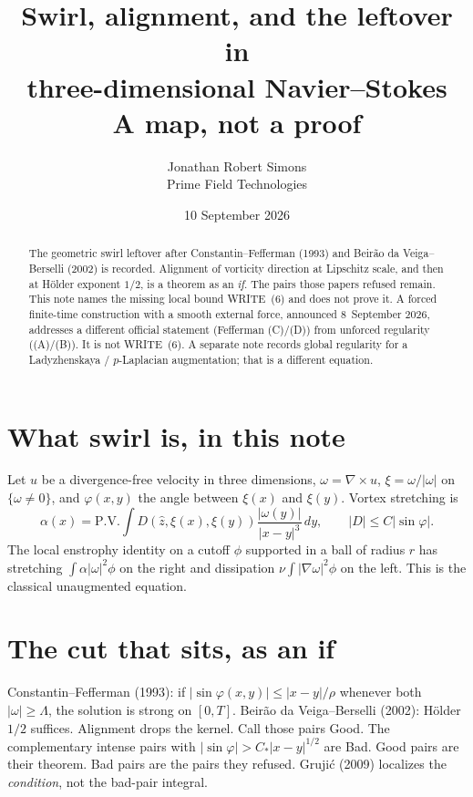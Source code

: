 \documentclass[11pt]{article}
\title{Swirl, alignment, and the leftover in\\
three-dimensional Navier--Stokes\\
\large A map, not a proof}
\author{Jonathan Robert Simons\\
Prime Field Technologies}
\date{10 September 2026}
\begin{document}
\maketitle

\begin{abstract}
The geometric swirl leftover after Constantin--Fefferman (1993)
and Beir\~ao da Veiga--Berselli (2002) is recorded. Alignment of
vorticity direction at Lipschitz scale, and then at H\"older
exponent \(1/2\), is a theorem as an \emph{if}. The pairs those
papers refused remain. This note names the missing local bound
WRITE~(6) and does not prove it. A forced finite-time construction
with a smooth external force, announced 8~September 2026, addresses
a different official statement (Fefferman (C)/(D)) from unforced
regularity ((A)/(B)). It is not WRITE~(6). A separate note records
global regularity for a Ladyzhenskaya / \(p\)-Laplacian augmentation;
that is a different equation.
\end{abstract}

\section{What swirl is, in this note}

Let \(u\) be a divergence-free velocity in three dimensions,
\(\omega=\nabla\times u\), \(\xi=\omega/|\omega|\) on
\(\{\omega\neq 0\}\), and \(\varphi(x,y)\) the angle between
\(\xi(x)\) and \(\xi(y)\). Vortex stretching is
\[
\alpha(x)=\mathrm{P.V.}\int D(\hat z,\xi(x),\xi(y))
\frac{|\omega(y)|}{|x-y|^3}\,dy,
\qquad
|D|\le C|\sin\varphi|.
\]
The local enstrophy identity on a cutoff \(\phi\) supported in a
ball of radius \(r\) has stretching \(\int\alpha|\omega|^2\phi\)
on the right and dissipation \(\nu\int|\nabla\omega|^2\phi\) on
the left. This is the classical unaugmented equation.

\section{The cut that sits, as an if}

Constantin--Fefferman (1993): if
\(|\sin\varphi(x,y)|\le|x-y|/\rho\) whenever both
\(|\omega|\ge\Lambda\), the solution is strong on \([0,T]\).
Beir\~ao da Veiga--Berselli (2002): H\"older \(1/2\) suffices.
Alignment drops the kernel. Call those pairs Good. The complementary
intense pairs with \(|\sin\varphi|>C_*|x-y|^{1/2}\) are Bad.
Good pairs are their theorem. Bad pairs are the pairs they refused.
Gruji\'c (2009) localizes the \emph{condition}, not the bad-pair
integral.
\end{document}
